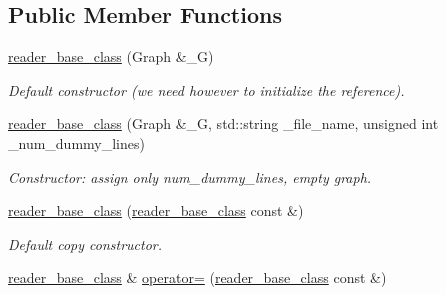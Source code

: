 \subsection*{Public Member Functions}
\begin{DoxyCompactItemize}
\item 
\hypertarget{classreader__base__class_a43fc72713a7023fce7eaa15266b6fb6f}{
\hyperlink{classreader__base__class_a43fc72713a7023fce7eaa15266b6fb6f}{reader\_\-base\_\-class} (Graph \&\_\-G)}
\label{classreader__base__class_a43fc72713a7023fce7eaa15266b6fb6f}

\begin{DoxyCompactList}\small\item\em Default constructor (we need however to initialize the reference). \item\end{DoxyCompactList}\item 
\hypertarget{classreader__base__class_aa24f5907deb19cfc75480de9f6535fe2}{
\hyperlink{classreader__base__class_aa24f5907deb19cfc75480de9f6535fe2}{reader\_\-base\_\-class} (Graph \&\_\-G, std::string \_\-file\_\-name, unsigned int \_\-num\_\-dummy\_\-lines)}
\label{classreader__base__class_aa24f5907deb19cfc75480de9f6535fe2}

\begin{DoxyCompactList}\small\item\em Constructor: assign only num\_\-dummy\_\-lines, empty graph. \item\end{DoxyCompactList}\item 
\hypertarget{classreader__base__class_a37c8eda56c3b51c2e5aa1b09fc689503}{
\hyperlink{classreader__base__class_a37c8eda56c3b51c2e5aa1b09fc689503}{reader\_\-base\_\-class} (\hyperlink{classreader__base__class}{reader\_\-base\_\-class} const \&)}
\label{classreader__base__class_a37c8eda56c3b51c2e5aa1b09fc689503}

\begin{DoxyCompactList}\small\item\em Default copy constructor. \item\end{DoxyCompactList}\item 
\hypertarget{classreader__base__class_a7629888633c2f453b792d2e63adad1d8}{
\hyperlink{classreader__base__class}{reader\_\-base\_\-class} \& \hyperlink{classreader__base__class_a7629888633c2f453b792d2e63adad1d8}{operator=} (\hyperlink{classreader__base__class}{reader\_\-base\_\-class} const \&)}
\label{classreader__base__class_a7629888633c2f453b792d2e63adad1d8}


\end{DoxyCompactItemize}
